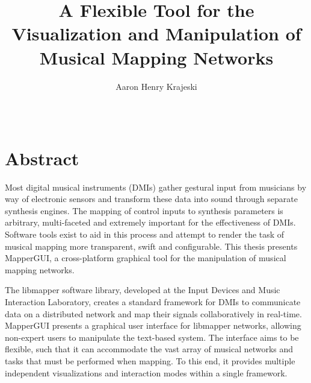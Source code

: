 \documentclass [12pt,letterpaper]{report}
\begin{document}

\title{A Flexible Tool for the Visualization and Manipulation of Musical Mapping Networks}
\author{Aaron Henry Krajeski}
\date{\Month\ \number\year}

\maketitle

\newpage
\thispagestyle{empty}
\mbox{}
\newpage

\raggedbottom
\onehalfspacing
{}


\section*{\centering Abstract}

Most digital musical instruments (DMIs) gather gestural input from musicians by way of electronic sensors and transform these data into sound through separate synthesis engines. The mapping of control inputs to synthesis parameters is arbitrary, multi-faceted and extremely important for the effectiveness of DMIs. Software tools exist to aid in this process and attempt to render the task of musical mapping more transparent, swift and configurable. This thesis presents MapperGUI, a cross-platform graphical tool for the manipulation of musical mapping networks. 

The libmapper software library, developed at the Input Devices and Music Interaction Laboratory, creates a standard framework for DMIs to communicate data on a distributed network and map their signals collaboratively in real-time. MapperGUI presents a graphical user interface for libmapper networks, allowing non-expert users to manipulate the text-based system. The interface aims to be flexible, such that it can accommodate the vast array of musical networks and tasks that must be performed when mapping. To this end, it provides multiple independent visualizations and interaction modes within a single framework. 
\end{document}
